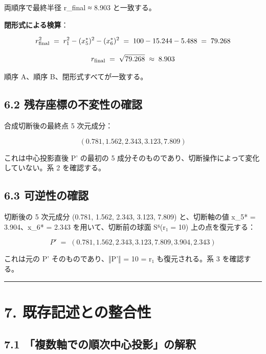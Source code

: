 \documentclass[a4paper,11pt]{ltjsarticle}
\theoremstyle{definition}
\theoremstyle{remark}
\begin{document}
両順序で最終半径 r\_final ≈ 8.903 と一致する。

\textbf{閉形式による検算}：

\[
r_{\rm final}^{2} \;=\; r_{1}^{2} - (x_5^{*})^{2} - (x_6^{*})^{2} \;=\; 100 - 15.244 - 5.488 \;=\; 79.268
\]

\[
r_{\rm final} \;=\; \sqrt{79.268} \;\approx\; 8.903
\]

順序 A、順序 B、閉形式すべてが一致する。

\subsection{6.2
残存座標の不変性の確認}\label{ux6b8bux5b58ux5ea7ux6a19ux306eux4e0dux5909ux6027ux306eux78baux8a8d}

合成切断後の最終点 5 次元成分：

\[
(0.781, 1.562, 2.343, 3.123, 7.809)
\]

これは中心投影直後 P' の最初の 5
成分そのものであり、切断操作によって変化していない。系 2 を確認する。

\subsection{6.3
可逆性の確認}\label{ux53efux9006ux6027ux306eux78baux8a8d}

切断後の 5 次元成分 (0.781, 1.562, 2.343, 3.123, 7.809) と、切断軸の値
x\_5* = 3.904、x\_6* = 2.343 を用いて、切断前の球面 S⁶(r₁ = 10)
上の点を復元する：

\[
P' \;=\; (0.781, 1.562, 2.343, 3.123, 7.809, 3.904, 2.343)
\]

これは元の P' そのものであり、‖P'‖ = 10 = r₁ も復元される。系 3
を確認する。

\begin{center}\rule{0.5\linewidth}{0.5pt}\end{center}

\section{7.
既存記述との整合性}\label{ux65e2ux5b58ux8a18ux8ff0ux3068ux306eux6574ux5408ux6027}

\subsection{7.1
「複数軸での順次中心投影」の解釈}\label{ux8907ux6570ux8ef8ux3067ux306eux9806ux6b21ux4e2dux5fc3ux6295ux5f71ux306eux89e3ux91c8}
\end{document}
